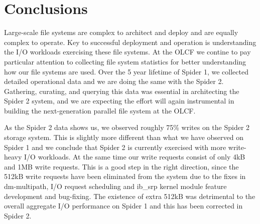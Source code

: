 \section*{Conclusions}
\label{sec:conc}

Large-scale file systems are complex to architect and deploy and are
equally complex to operate. Key to successful deployment and operation is
understanding the I/O workloads exercising these file systems. At the OLCF we
contine to pay particular attention to collecting file system statistics for better
understanding how our file systems are used. Over the 5 year lifetime of
Spider 1, we collected detailed operational data and we are doing
the same with the Spider 2. Gathering, curating, and querying this data was essential in
architecting the Spider 2 system, and we are expecting the effort will again
instrumental in building the next-generation parallel file system at the OLCF.


As the Spider 2 data shows us, we observed roughly 75\% writes on the Spider 2
storage system. This is slightly more different than what we have observed on
Spider 1 and we conclude that Spider 2 is currently exercised with more
write-heavy I/O workloads. At the same time our write requests consist of only
4kB and 1MB write requests. This is a good step in the right direction, since
the 512kB write requests have been eliminated from the system due to the fixes
in dm-multipath, I/O request scheduling and ib\_srp kernel module feature
development and bug-fixing. The existence of extra 512kB was detrimental to the
overall aggregate I/O performance on Spider 1 and this has been corrected in
Spider 2.
